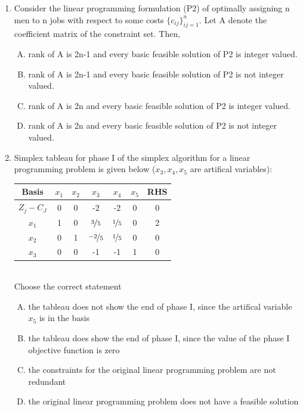 \documentclass[journal,12pt,twocolumn]{IEEEtran}
\begin{document}
\begin{enumerate}
\begin{enumerate}[(A)]
\end{enumerate}

\item Consider the linear programming formulation (P2) of optimally assigning n men to n jobs with respect to some costs $\{c_{ij}\}_{ij=1}^n$. Let A denote the coefficient matrix of the constraint set. Then,

\begin{enumerate}[(A)]
\setlength\itemsep{1em}

\item rank of A is 2n-1 and every basic feasible solution of P2 is integer valued.
\item rank of A is 2n-1 and every basic feasible solution of P2 is not integer valued.
\item rank of A is 2n and every basic feasible solution of P2 is integer valued.
\item rank of A is 2n and every basic feasible solution of P2 is not integer valued.

\end{enumerate}

\item Simplex tableau for phase I of the simplex algorithm for a linear programming problem is given below ($x_3, \! x_4, \! x_5$ are artifical variables): \\
\bigskip

\begin{tabular}{|c|c|c|c|c|c|c|} \hline
Basis & $x_1$ & $x_2$ & $x_3$ & $x_4$ & $x_5$ & RHS \\ \hline
$Z_j-C_J$ & 0 & 0 & -2 & -2 & 0 & 0 \\ 
$x_1$ & 1 & 0 & $\nicefrac{3}{5}$ & $\nicefrac{1}{5}$ & 0 & 2 \\
$x_2$ & 0 & 1 & $\nicefrac{-2}{5}$ & $\nicefrac{1}{5}$ & 0 & 0 \\
$x_3$ & 0 & 0 & -1 & -1 & 1 & 0 \\ \hline
\end{tabular}
\\
\bigskip
Choose the correct statement

\begin{enumerate}[(A)]
\setlength\itemsep{1em}

\item the tableau does not show the end of phase I, since the artifical variable $x_5$ is in the basis
\item the tableau does show the end of phase I, since the value of the phase I objective function is zero
\item the constraints for the original linear programming problem are not redundant
\item the original linear programming problem does not have a feasible solution


\end{enumerate}
\end{enumerate}
\end{document}
